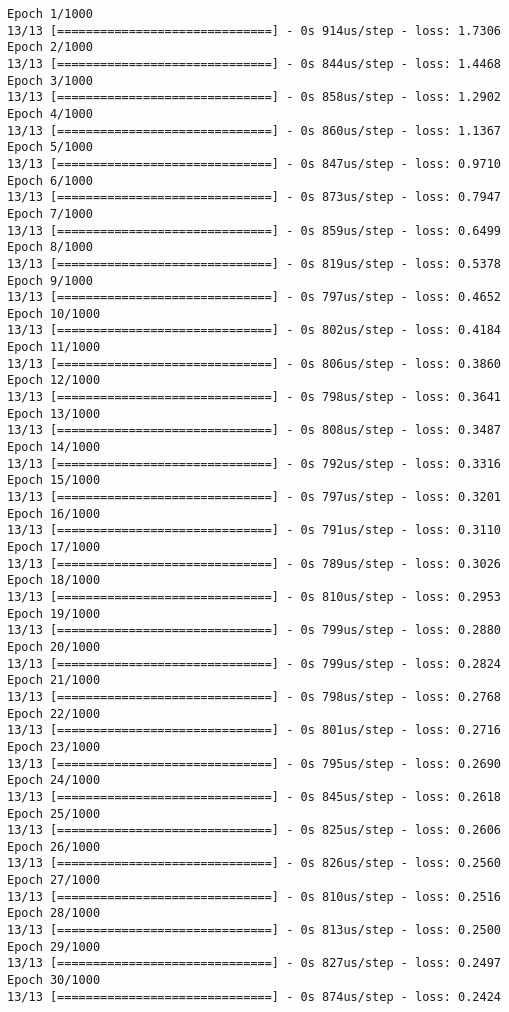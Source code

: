 \documentclass[11pt]{article}
\begin{document}
    \begin{Verbatim}[commandchars=\\\{\}]
Epoch 1/1000
13/13 [==============================] - 0s 914us/step - loss: 1.7306
Epoch 2/1000
13/13 [==============================] - 0s 844us/step - loss: 1.4468
Epoch 3/1000
13/13 [==============================] - 0s 858us/step - loss: 1.2902
Epoch 4/1000
13/13 [==============================] - 0s 860us/step - loss: 1.1367
Epoch 5/1000
13/13 [==============================] - 0s 847us/step - loss: 0.9710
Epoch 6/1000
13/13 [==============================] - 0s 873us/step - loss: 0.7947
Epoch 7/1000
13/13 [==============================] - 0s 859us/step - loss: 0.6499
Epoch 8/1000
13/13 [==============================] - 0s 819us/step - loss: 0.5378
Epoch 9/1000
13/13 [==============================] - 0s 797us/step - loss: 0.4652
Epoch 10/1000
13/13 [==============================] - 0s 802us/step - loss: 0.4184
Epoch 11/1000
13/13 [==============================] - 0s 806us/step - loss: 0.3860
Epoch 12/1000
13/13 [==============================] - 0s 798us/step - loss: 0.3641
Epoch 13/1000
13/13 [==============================] - 0s 808us/step - loss: 0.3487
Epoch 14/1000
13/13 [==============================] - 0s 792us/step - loss: 0.3316
Epoch 15/1000
13/13 [==============================] - 0s 797us/step - loss: 0.3201
Epoch 16/1000
13/13 [==============================] - 0s 791us/step - loss: 0.3110
Epoch 17/1000
13/13 [==============================] - 0s 789us/step - loss: 0.3026
Epoch 18/1000
13/13 [==============================] - 0s 810us/step - loss: 0.2953
Epoch 19/1000
13/13 [==============================] - 0s 799us/step - loss: 0.2880
Epoch 20/1000
13/13 [==============================] - 0s 799us/step - loss: 0.2824
Epoch 21/1000
13/13 [==============================] - 0s 798us/step - loss: 0.2768
Epoch 22/1000
13/13 [==============================] - 0s 801us/step - loss: 0.2716
Epoch 23/1000
13/13 [==============================] - 0s 795us/step - loss: 0.2690
Epoch 24/1000
13/13 [==============================] - 0s 845us/step - loss: 0.2618
Epoch 25/1000
13/13 [==============================] - 0s 825us/step - loss: 0.2606
Epoch 26/1000
13/13 [==============================] - 0s 826us/step - loss: 0.2560
Epoch 27/1000
13/13 [==============================] - 0s 810us/step - loss: 0.2516
Epoch 28/1000
13/13 [==============================] - 0s 813us/step - loss: 0.2500
Epoch 29/1000
13/13 [==============================] - 0s 827us/step - loss: 0.2497
Epoch 30/1000
13/13 [==============================] - 0s 874us/step - loss: 0.2424

\end{Verbatim}
\end{document}
